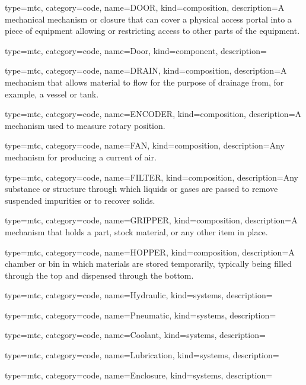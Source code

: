 {
  type=mtc,
  category=code,
  name={DOOR},
  kind={composition},
  description={A mechanical mechanism or closure that can cover a physical access portal into a piece of equipment allowing or restricting access to other parts of the equipment.}
}


{
  type=mtc,
  category=code,
  name={Door},
  kind={component},
  description={}
}


{
  type=mtc,
  category=code,
  name={DRAIN},
  kind={composition},
  description={A mechanism that allows material to flow for the purpose of drainage from, for example, a vessel or tank.}
}


{
  type=mtc,
  category=code,
  name={ENCODER},
  kind={composition},
  description={A mechanism used to measure rotary position.}
}


{
  type=mtc,
  category=code,
  name={FAN},
  kind={composition},
  description={Any mechanism for producing a current of air.}
}


{
  type=mtc,
  category=code,
  name={FILTER},
  kind={composition},
  description={Any substance or structure through which liquids or gases are passed to remove suspended impurities or to recover solids.}
}


{
  type=mtc,
  category=code,
  name={GRIPPER},
  kind={composition},
  description={A mechanism that holds a part, stock material, or any other item in place.}
}


{
  type=mtc,
  category=code,
  name={HOPPER},
  kind={composition},
  description={A chamber or bin in which materials are stored temporarily, typically being filled through the top and dispensed through the bottom.}
}


{
  type=mtc,
  category=code,
  name={Hydraulic},
  kind={systems},
  description={}
}


{
  type=mtc,
  category=code,
  name={Pneumatic},
  kind={systems},
  description={}
}


{
  type=mtc,
  category=code,
  name={Coolant},
  kind={systems},
  description={}
}


{
  type=mtc,
  category=code,
  name={Lubrication},
  kind={systems},
  description={}
}


{
  type=mtc,
  category=code,
  name={Enclosure},
  kind={systems},
  description={}
}


